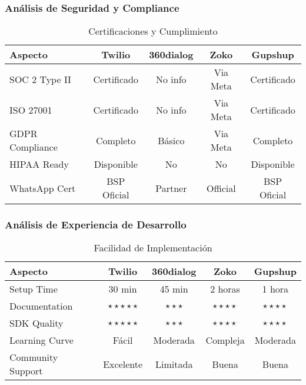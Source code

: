 \documentclass{article}
\begin{document}
\subsubsection{Análisis de Seguridad y Compliance}

\begin{table}[H]
\centering
\caption{Certificaciones y Cumplimiento}
\begin{tabular}{|l|c|c|c|c|}
\hline
\textbf{Aspecto} & \textbf{Twilio} & \textbf{360dialog} & \textbf{Zoko} & \textbf{Gupshup} \\
\hline
SOC 2 Type II & \textcolor{successgreen}{Certificado} & \textcolor{errorred}{No info} & \textcolor{successgreen}{Via Meta} & \textcolor{successgreen}{Certificado} \\
\hline
ISO 27001 & \textcolor{successgreen}{Certificado} & \textcolor{errorred}{No info} & \textcolor{successgreen}{Via Meta} & \textcolor{successgreen}{Certificado} \\
\hline
GDPR Compliance & \textcolor{successgreen}{Completo} & \textcolor{warningorange}{Básico} & \textcolor{successgreen}{Via Meta} & \textcolor{successgreen}{Completo} \\
\hline
HIPAA Ready & \textcolor{successgreen}{Disponible} & \textcolor{errorred}{No} & \textcolor{errorred}{No} & \textcolor{successgreen}{Disponible} \\
\hline
WhatsApp Cert & \textcolor{successgreen}{BSP Oficial} & \textcolor{warningorange}{Partner} & \textcolor{successgreen}{Official} & \textcolor{successgreen}{BSP Oficial} \\
\hline
\end{tabular}
\end{table}

\subsubsection{Análisis de Experiencia de Desarrollo}

\begin{table}[H]
\centering
\caption{Facilidad de Implementación}
\begin{tabular}{|l|c|c|c|c|}
\hline
\textbf{Aspecto} & \textbf{Twilio} & \textbf{360dialog} & \textbf{Zoko} & \textbf{Gupshup} \\
\hline
Setup Time & 30 min & 45 min & 2 horas & 1 hora \\
\hline
Documentation & $\star\star\star\star\star$ & $\star\star\star$ & $\star\star\star\star$ & $\star\star\star\star$ \\
\hline
SDK Quality & $\star\star\star\star\star$ & $\star\star\star$ & $\star\star\star\star$ & $\star\star\star\star$ \\
\hline
Learning Curve & Fácil & Moderada & Compleja & Moderada \\
\hline
Community Support & Excelente & Limitada & Buena & Buena \\
\hline
\end{tabular}
\end{table}
\end{document}
